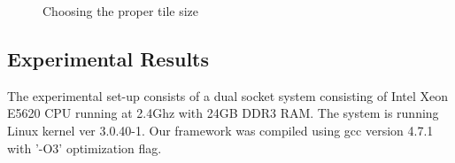 \begin{figure}[t!]
  \centering
  \caption{Choosing the proper tile size}
  \label{fig:comm}
\end{figure}

\subsection{Experimental Results}
\label{sec:results-1}

The experimental set-up consists of a dual socket system consisting of
Intel Xeon E5620 CPU running at 2.4Ghz with 24GB DDR3 RAM. The system
is running Linux kernel ver 3.0.40-1. Our framework was compiled
using gcc version 4.7.1 with '-O3' optimization flag.

